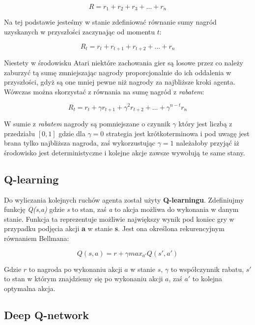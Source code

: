 \documentclass[12pt]{article}
\begin{document}
$$R=r_1 + r_2 + r_3 + \dots + r_n$$

Na tej podstawie jesteśmy w stanie zdefiniować równanie sumy nagród uzyskanych w przyszłości zaczynając od momentu $t$:

$$R_t=r_t + r_{t+1}+ r_{t+2} + \dots + r_n$$

Niestety w środowisku Atari niektóre zachowania gier są losowe przez co należy zaburzyć tą sumę zmniejszając nagrody proporcjonalnie do ich oddalenia w przyszłości, gdyż są one mniej pewne niż nagrody za najbliższe kroki agenta. Wówczas można skorzystać z równania na sumę nagród z \textit{rabatem}:

$$R_t=r_t + \gamma r_{t+1}+  \gamma^2 r_{t+2} + \dots + \gamma^{n-t}r_n$$

W sumie z \textit{rabatem} nagrody są pomniejszane o czynnik $\gamma$ który jest liczbą z przedziału $[0,1]$ gdzie dla $\gamma =0$ strategia jest krótkoterminowa i pod uwagę jest brana tylko najbliższa nagroda, zaś wykorzustując $\gamma =1$ należałoby przyjąć iż środowisko jest deterministyczne i kolejne akcje zawsze wywołują te same stany.

\subsection{Q-learning}

Do wyliczania kolejnych ruchów agenta został użyty \textbf{Q-learningu}. Zdefiniujmy funkcję \textit{Q(s,a)} gdzie \textit{s} to stan, zaś \textit{a} to akcja możliwa do wykonania w danym stanie. Funkcja ta reprezentuje możliwie największy wynik pod koniec gry w przypadku podjęcia akcji \textbf{a} w stanie \textbf{s}. Jest ona określona rekurencyjnym równaniem Bellmana:

$$Q(s,a) =  r + \gamma max_{a'}Q(s',a')$$

Gdzie $r$ to nagroda po wykonaniu akcji $a$ w stanie $s$, $\gamma$ to współczynnik rabatu, $s'$ to stan w którym znajdziemy się po wykonaniu akcji $a$, zaś $a'$ to kolejna optymalna akcja.

\subsection{Deep Q-network}
\end{document}
